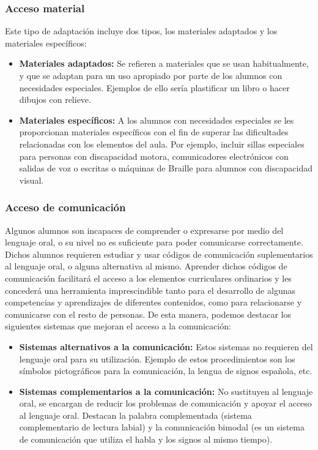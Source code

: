 \subsubsection{Acceso material}
Este tipo de adaptación incluye dos tipos, los materiales adaptados y los materiales específicos:
\begin{itemize}
    \item \textbf{Materiales adaptados:} Se refieren a materiales que se usan habitualmente, y que se adaptan para un uso apropiado por parte de los alumnos con necesidades especiales. Ejemplos de ello sería plastificar un libro o hacer dibujos con relieve.
    \item \textbf{Materiales específicos:} A los alumnos con necesidades especiales se les proporcionan materiales específicos con el fin de superar las dificultades relacionadas con los elementos del aula. Por ejemplo, incluir sillas especiales para personas con discapacidad motora, comunicadores electrónicos con salidas de voz o escritas o máquinas de Braille para alumnos con discapacidad visual.
\end{itemize}

\subsubsection{Acceso de comunicación}
Algunos alumnos son incapaces de comprender o expresarse por medio del lenguaje oral, o su nivel no es suficiente para poder comunicarse correctamente. Dichos alumnos requieren estudiar y usar códigos de comunicación suplementarios al lenguaje oral, o alguna alternativa al mismo. Aprender dichos códigos de comunicación facilitará el acceso a los elementos curriculares ordinarios y les concederá una herramienta imprescindible tanto para el desarrollo de algunas competencias y aprendizajes de diferentes contenidos, como para relacionarse y comunicarse con el resto de personas. De esta manera, podemos destacar los siguientes sistemas que mejoran el acceso a la comunicación:
\begin{itemize}
    \item \textbf{Sistemas alternativos a la comunicación:} Estos sistemas no requieren del lenguaje oral para su utilización. Ejemplo de estos procedimientos son los símbolos pictográficos para la comunicación, la lengua de signos española, etc.

    \item \textbf{Sistemas complementarios a la comunicación:} No sustituyen al lenguaje oral, se encargan de reducir los problemas de comunicación y apoyar el acceso al lenguaje oral. Destacan la palabra complementada (sistema complementario de lectura labial) y la comunicación bimodal (es un sistema de comunicación que utiliza el habla y los signos al mismo tiempo).
\end{itemize}


